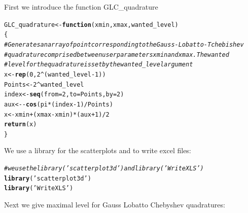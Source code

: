 \documentclass[times,12pt,3p]{article}\usepackage[]{graphicx}\usepackage[]{color}
\makeatletter
\newcommand{\hlnum}[1]{\textcolor[rgb]{0.686,0.059,0.569}{#1}}%
\newcommand{\hlstr}[1]{\textcolor[rgb]{0.192,0.494,0.8}{#1}}%
\newcommand{\hlcom}[1]{\textcolor[rgb]{0.678,0.584,0.686}{\textit{#1}}}%
\newcommand{\hlopt}[1]{\textcolor[rgb]{0,0,0}{#1}}%
\newcommand{\hlstd}[1]{\textcolor[rgb]{0.345,0.345,0.345}{#1}}%
\newcommand{\hlkwa}[1]{\textcolor[rgb]{0.161,0.373,0.58}{\textbf{#1}}}%
\newcommand{\hlkwb}[1]{\textcolor[rgb]{0.69,0.353,0.396}{#1}}%
\newcommand{\hlkwc}[1]{\textcolor[rgb]{0.333,0.667,0.333}{#1}}%
\newcommand{\hlkwd}[1]{\textcolor[rgb]{0.737,0.353,0.396}{\textbf{#1}}}%
\newenvironment{kframe}{%
 \def\at@end@of@kframe{}%
 \ifinner\ifhmode%
  \def\at@end@of@kframe{\end{minipage}}%
  \begin{minipage}{\columnwidth}%
 \fi\fi%
 \def\FrameCommand##1{\hskip\@totalleftmargin \hskip-\fboxsep
 \colorbox{shadecolor}{##1}\hskip-\fboxsep
     \hskip-\linewidth \hskip-\@totalleftmargin \hskip\columnwidth}%
 \MakeFramed {\advance\hsize-\width
   \@totalleftmargin\z@ \linewidth\hsize
   \@setminipage}}%
 {\par\unskip\endMakeFramed%
 \at@end@of@kframe}
\newenvironment{knitrout}{}{} %
\makeatother
\begin{document}
First we introduce the function GLC\_quadrature 

\begin{knitrout}
\color{fgcolor}\begin{kframe}
\begin{alltt}
\hlstd{GLC_quadrature} \hlkwb{<-} \hlkwa{function}\hlstd{(} \hlkwc{xmin}\hlstd{,} \hlkwc{xmax}\hlstd{,} \hlkwc{wanted_level}\hlstd{)}
\hlstd{\{}
\hlcom{# Generates an array of point corresponding to the Gauss-Lobatto-Tchebishev}
\hlcom{# quadrature comprised between user parameters xmin and xmax. The wanted}
\hlcom{# level for the quadrature is set by the wanted_level argument}
    \hlstd{x} \hlkwb{<-} \hlkwd{rep}\hlstd{(}\hlnum{0}\hlstd{,}\hlnum{2}\hlopt{^}\hlstd{(wanted_level}\hlopt{-}\hlnum{1}\hlstd{))}
    \hlstd{Points} \hlkwb{<-} \hlnum{2}\hlopt{^}\hlstd{wanted_level}
    \hlstd{index} \hlkwb{<-} \hlkwd{seq}\hlstd{(}\hlkwc{from}\hlstd{=}\hlnum{2}\hlstd{,} \hlkwc{to}\hlstd{=Points,}\hlkwc{by}\hlstd{=}\hlnum{2}\hlstd{)}
    \hlstd{aux} \hlkwb{<-} \hlopt{-}\hlkwd{cos}\hlstd{(pi}\hlopt{*}\hlstd{(index}\hlopt{-}\hlnum{1}\hlstd{)}\hlopt{/}\hlstd{Points)}
    \hlstd{x}\hlkwb{<-} \hlstd{xmin} \hlopt{+} \hlstd{(xmax}\hlopt{-}\hlstd{xmin)}\hlopt{*}\hlstd{(aux}\hlopt{+}\hlnum{1}\hlstd{)}\hlopt{/}\hlnum{2}
    \hlkwd{return}\hlstd{(x)}
\hlstd{\}}
\end{alltt}
\end{kframe}
\end{knitrout}

We use a library for the scatterplots and to write excel files:

\begin{knitrout}
\color{fgcolor}\begin{kframe}
\begin{alltt}
\hlcom{#we use the library('scatterplot3d') and library('WriteXLS')}
\hlkwd{library}\hlstd{(}\hlstr{'scatterplot3d'}\hlstd{)}
\hlkwd{library}\hlstd{(}\hlstr{'WriteXLS'}\hlstd{)}
\end{alltt}
\end{kframe}
\end{knitrout}

Next we give maximal level for Gauss Lobatto Chebyshev quadratures:
\end{document}
